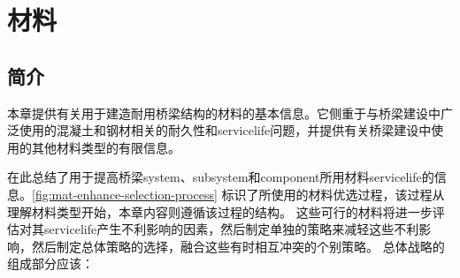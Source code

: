 \chapter{材料}
\label{chp:materials}
\section{简介}
本章提供有关用于建造耐用桥梁结构的材料的基本信息。它侧重于与桥梁建设中广泛使用的混凝土和钢材相关的耐久性和\gls*{servicelife}问题，并提供有关桥梁建设中使用的其他材料类型的有限信息。

在此总结了用于提高桥梁\gls*{system}、\gls*{subsystem}和\gls*{component}所用材料\gls*{servicelife}的信息。\cref{fig:mat-enhance-selection-process} 标识了所使用的材料优选过程，该过程从理解材料类型开始，本章内容则遵循该过程的结构。 这些可行的材料将进一步评估对其\gls*{servicelife}产生不利影响的因素，然后制定单独的策略来减轻这些不利影响，然后制定总体策略的选择，融合这些有时相互冲突的个别策略。 总体战略的组成部分应该：

